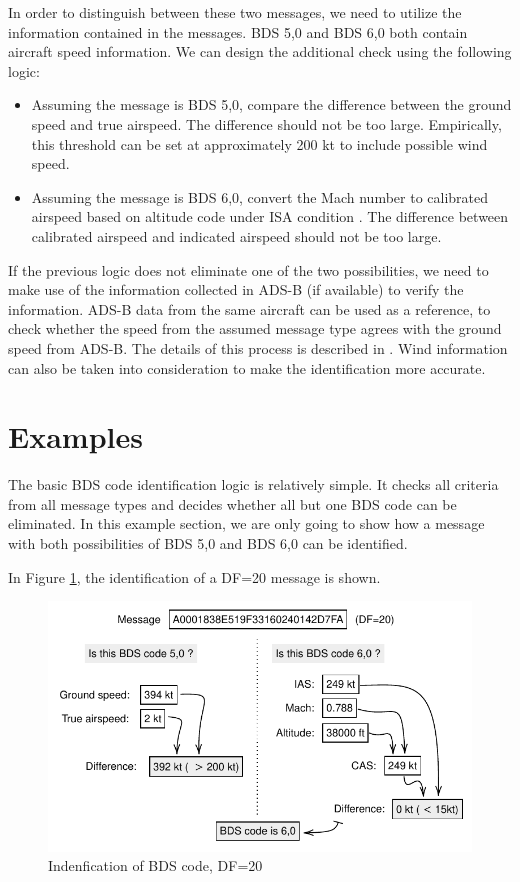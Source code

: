 In order to distinguish between these two messages, we need to utilize the information contained in the messages. BDS 5,0 and BDS 6,0 both contain aircraft speed information. We can design the additional check using the following logic:

\begin{itemize}
    \item Assuming the message is BDS 5,0, compare the difference between the ground speed and true airspeed. The difference should not be too large. Empirically, this threshold can be set at approximately 200 kt to include possible wind speed. 
    \item Assuming the message is BDS 6,0, convert the Mach number to calibrated airspeed based on altitude code under ISA condition \cite{young2017}. The difference between calibrated airspeed and indicated airspeed should not be too large.
\end{itemize}

If the previous logic does not eliminate one of the two possibilities, we need to make use of the information collected in ADS-B (if available) to verify the information. ADS-B data from the same aircraft can be used as a reference, to check whether the speed from the assumed message type agrees with the ground speed from ADS-B. The details of this process is described in \cite{sun2019pymodes}. Wind information can also be taken into consideration to make the identification more accurate.


\section{Examples}

The basic BDS code identification logic is relatively simple. It checks all criteria from all message types and decides whether all but one BDS code can be eliminated. In this example section, we are only going to show how a message with both possibilities of BDS 5,0 and BDS 6,0 can be identified.


In Figure \ref{fig:bds_bds_infer_example_1}, the identification of a DF=20 message is shown. 

\begin{figure}[ht]
\centering
  \includegraphics[scale=0.85]{figures/mode_s/bds_infer_example_1.pdf}
\caption{Indenfication of BDS code, DF=20}
\label{fig:bds_bds_infer_example_1}
\end{figure}

